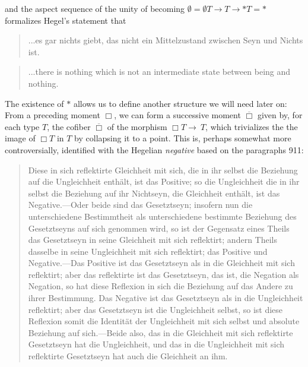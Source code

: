 \documentclass{article}
\begin{document}
and the aspect sequence of the unity of becoming $\emptyset = \emptyset T\rightarrow T \rightarrow * T = *$ formalizes Hegel's statement that

\begin{quote}
    ...es gar nichts giebt, das nicht ein Mittelzustand zwischen Seyn und Nichts ist.
\end{quote}

\begin{quote}
    ...there is nothing which is not an intermediate state between being and nothing.
\end{quote}

The existence of $*$ allows us to define another structure we will need later on: From a preceding moment $\Box$, we can form a successive moment $\overline{\Box}$ given by, for each type $T$, the cofiber $\overline{\Box}$ of the morphism $\Box T\rightarrow\ T$, which trivializes the the image of $\Box T$ in $T$ by collapsing it to a point. This is, perhaps somewhat more controversially, identified with the Hegelian \emph{negative} based on the paragraphs 911:

\begin{quote}
    Diese in sich reflektirte Gleichheit mit sich, die in ihr selbst die Beziehung auf die Ungleichheit enthält, ist das Positive; so die Ungleichheit die in ihr selbst die Beziehung auf ihr Nichtseyn, die Gleichheit enthält, ist das Negative.—Oder beide sind das Gesetztseyn; insofern nun die unterschiedene Bestimmtheit als unterschiedene bestimmte Beziehung des Gesetztseyns auf sich genommen wird, so ist der Gegensatz eines Theils das Gesetztseyn in seine Gleichheit mit sich reflektirt; andern Theils dasselbe in seine Ungleichheit mit sich reflektirt; das Positive und Negative.—Das Positive ist das Gesetztseyn als in die Gleichheit mit sich reflektirt; aber das reflektirte ist das Gesetztseyn, das ist, die Negation als Negation, so hat diese Reflexion in sich die Beziehung auf das Andere zu ihrer Bestimmung. Das Negative ist das Gesetztseyn als in die Ungleichheit reflektirt; aber das Gesetztseyn ist die Ungleichheit selbst, so ist diese Reflexion somit die Identität der Ungleichheit mit sich selbst und absolute Beziehung auf sich.—Beide also, das in die Gleichheit mit sich reflektirte Gesetztseyn hat die Ungleichheit, und das in die Ungleichheit mit sich reflektirte Gesetztseyn hat auch die Gleichheit an ihm.
\end{quote}
\end{document}
